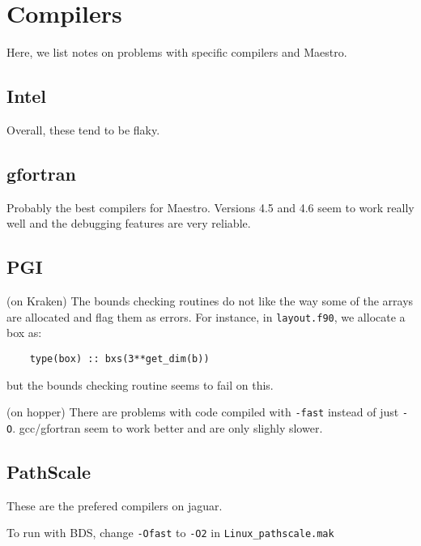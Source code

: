 \section{Compilers}

Here, we list notes on problems with specific compilers and Maestro.

\subsection{Intel}

Overall, these tend to be flaky. 

\subsection{gfortran}

Probably the best compilers for Maestro.  Versions 4.5 and 4.6 seem to work
really well and the debugging features are very reliable.


\subsection{PGI}

(on Kraken) The bounds checking routines do not like the way some of
the arrays are allocated and flag them as errors.  For instance, in
{\tt layout.f90}, we allocate a box as:
\begin{verbatim}
    type(box) :: bxs(3**get_dim(b))
\end{verbatim}
but the bounds checking routine seems to fail on this.

(on hopper) There are problems with code compiled with {\tt -fast}
instead of just {\tt -O}.  gcc/gfortran seem to work better and 
are only slighly slower.


\subsection{PathScale}

These are the prefered compilers on jaguar.

To run with BDS, change {\tt -Ofast} to {\tt -O2} in {\tt Linux\_pathscale.mak}
